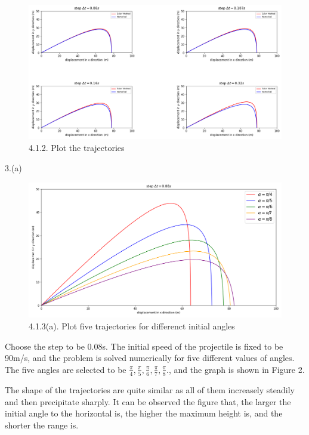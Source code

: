\documentclass{book}
\begin{document}
\begin{figure}[h]
  \centering
  \includegraphics[width=12cm,height=6cm]{project4.1.2.png}
  \caption{4.1.2. Plot the trajectories}
\end{figure}

\newpage
{\Large 3.(a)}
\begin{figure}[H]
  \centering
  \includegraphics[width=12cm,height=6cm]{project4.1.3(a).png}
  \caption{4.1.3(a). Plot five trajectories for differenct initial angles}
\end{figure}
Choose the step to be 0.08s.
The initial speed of the projectile is fixed to be 90m/s, and the problem is solved numerically for five different values of angles.
  {The five angles are selected to be $\frac{\pi}{4},\frac{\pi}{5},\frac{\pi}{6},\frac{\pi}{7},\frac{\pi}{8}.$}, and the graph is shown in Figure 2.

The shape of the trajectories are quite similar as all of them increasely steadily and then precipitate sharply.
It can be observed the figure that, the larger the initial angle to the horizontal is, the higher the maximum height is, and the shorter the range is.
\end{document}
